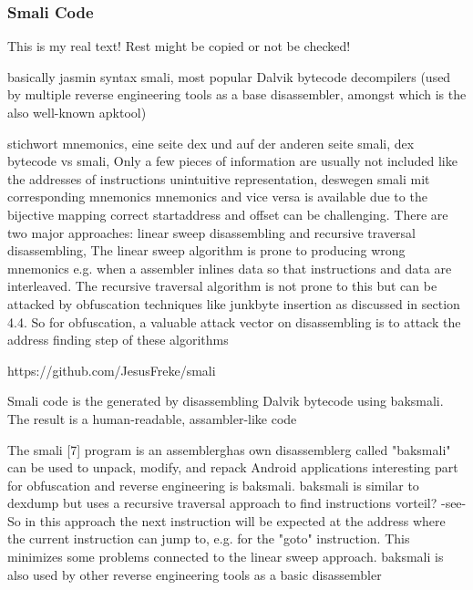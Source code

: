 \subsubsection{Smali Code}\label{subsubsection:tools-baksmali}
This is my real text! Rest might be copied or not be checked!

basically jasmin syntax
%
smali, most popular Dalvik bytecode decompilers (used by multiple reverse engineering tools as a base disassembler, amongst which is the also well-known apktool)
\cite{kovachevaMaster}
%

stichwort mnemonics, eine seite dex und auf der anderen seite smali, dex bytecode vs smali, Only a few pieces of information are usually not included like the addresses of instructions\newline
unintuitive representation, deswegen smali mit corresponding mnemonics\newline
mnemonics and vice versa is available due to the bijective mapping\newline
correct startaddress and offset can be challenging. There are two major approaches: linear sweep disassembling and recursive traversal disassembling, The linear sweep algorithm is prone to producing wrong mnemonics e.g. when a assembler inlines data so that instructions and data are interleaved. The recursive traversal algorithm is not prone to this but can be attacked by obfuscation techniques like junkbyte insertion as discussed in section 4.4. So for obfuscation, a valuable attack vector on disassembling is to attack the address finding step of these algorithms\newline

https://github.com/JesusFreke/smali

Smali code is the generated by disassembling Dalvik bytecode using baksmali. The result is a human-readable, assambler-like code

The smali [7] program is an \gls{assemblerg}has own \gls{disassemblerg} called "baksmali"\newline
can be used to unpack, modify, and repack Android applications\newline
interesting part for obfuscation and reverse engineering is baksmali. baksmali is similar to dexdump but uses a recursive traversal approach to find instructions\newline
vorteil? -see- So in this approach the next instruction will be expected at the address where the current instruction can jump to, e.g. for the "goto" instruction. This minimizes some problems connected to the linear sweep approach. baksmali is also used by other reverse engineering tools as a basic disassembler\newline

